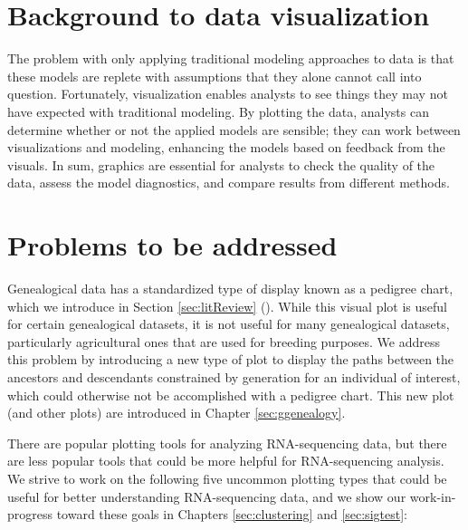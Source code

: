 \documentclass[11pt,a4paper,oldfontcommands,openany]{memoir}
\numberwithin{equation}{section} %
\begin{document}
\section{Background to data visualization}

The problem with only applying traditional modeling approaches to data is that these models are replete with assumptions that they alone cannot call into question. Fortunately, visualization enables analysts to see things they may not have expected with traditional modeling. By plotting the data, analysts can determine whether or not the applied models are sensible; they can work between visualizations and modeling, enhancing the models based on feedback from the visuals. In sum, graphics are essential for analysts to check the quality of the data, assess the model diagnostics, and compare results from different methods.

\section{Problems to be addressed}

Genealogical data has a standardized type of display known as a pedigree chart, which we introduce in Section \ref{sec:litReview} (\citealt{extra7}). While this visual plot is useful for certain genealogical datasets, it is not useful for many genealogical datasets, particularly agricultural ones that are used for breeding purposes. We address this problem by introducing a new type of plot to display the paths between the ancestors and descendants constrained by generation for an individual of interest, which could otherwise not be accomplished with a pedigree chart. This new plot (and other plots) are introduced in Chapter \ref{sec:ggenealogy}.

There are popular plotting tools for analyzing RNA-sequencing data, but there are less popular tools that could be more helpful for RNA-sequencing analysis. We strive to work on the following five uncommon plotting types that could be useful for better understanding RNA-sequencing data, and we show our work-in-progress toward these goals in Chapters \ref{sec:clustering} and \ref{sec:sigtest}:

\clearpage
\end{document}
